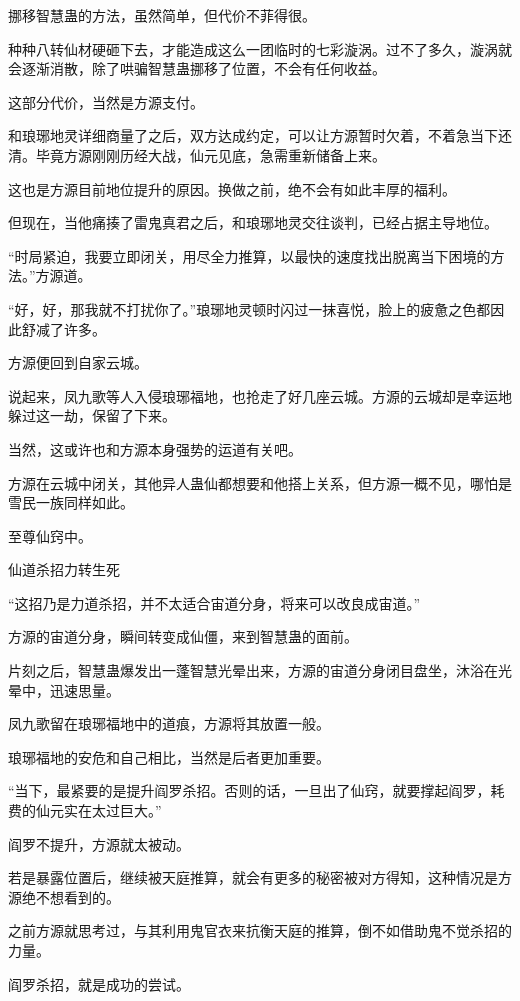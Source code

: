 \begin{this_body}
挪移智慧蛊的方法，虽然简单，但代价不菲得很。

种种八转仙材硬砸下去，才能造成这么一团临时的七彩漩涡。过不了多久，漩涡就会逐渐消散，除了哄骗智慧蛊挪移了位置，不会有任何收益。

这部分代价，当然是方源支付。

和琅琊地灵详细商量了之后，双方达成约定，可以让方源暂时欠着，不着急当下还清。毕竟方源刚刚历经大战，仙元见底，急需重新储备上来。

这也是方源目前地位提升的原因。换做之前，绝不会有如此丰厚的福利。

但现在，当他痛揍了雷鬼真君之后，和琅琊地灵交往谈判，已经占据主导地位。

“时局紧迫，我要立即闭关，用尽全力推算，以最快的速度找出脱离当下困境的方法。”方源道。

“好，好，那我就不打扰你了。”琅琊地灵顿时闪过一抹喜悦，脸上的疲惫之色都因此舒减了许多。

方源便回到自家云城。

说起来，凤九歌等人入侵琅琊福地，也抢走了好几座云城。方源的云城却是幸运地躲过这一劫，保留了下来。

当然，这或许也和方源本身强势的运道有关吧。

方源在云城中闭关，其他异人蛊仙都想要和他搭上关系，但方源一概不见，哪怕是雪民一族同样如此。

至尊仙窍中。

仙道杀招力转生死

“这招乃是力道杀招，并不太适合宙道分身，将来可以改良成宙道。”

方源的宙道分身，瞬间转变成仙僵，来到智慧蛊的面前。

片刻之后，智慧蛊爆发出一蓬智慧光晕出来，方源的宙道分身闭目盘坐，沐浴在光晕中，迅速思量。

凤九歌留在琅琊福地中的道痕，方源将其放置一般。

琅琊福地的安危和自己相比，当然是后者更加重要。

“当下，最紧要的是提升阎罗杀招。否则的话，一旦出了仙窍，就要撑起阎罗，耗费的仙元实在太过巨大。”

阎罗不提升，方源就太被动。

若是暴露位置后，继续被天庭推算，就会有更多的秘密被对方得知，这种情况是方源绝不想看到的。

之前方源就思考过，与其利用鬼官衣来抗衡天庭的推算，倒不如借助鬼不觉杀招的力量。

阎罗杀招，就是成功的尝试。


\end{this_body}
